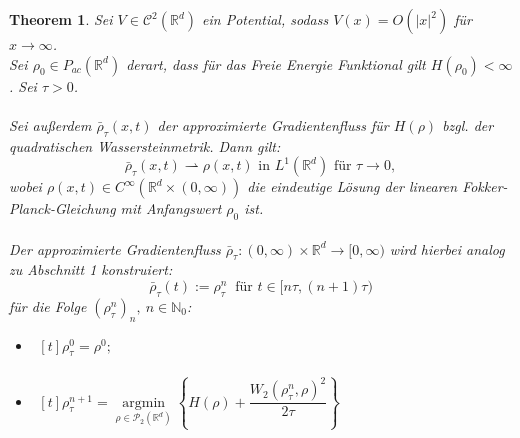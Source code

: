\documentclass[11pt,a4paper,notitlepage]{scrreprt}
\newcommand{\RR}{\mathbb{R}}
\newcommand{\NN}{\mathbb{N}}
\newtheorem{theorem}[defi]{Theorem}
\begin{document}
\begin{theorem}
Sei $V\in \mathcal{C}^2(\RR^d)$ ein Potential, sodass $V(x)=O(\vert x \vert^2)$ für $x\to\infty$. \\
Sei $\rho_0\in P_{ac}(\RR^d)$ derart, dass für das Freie Energie Funktional gilt $H(\rho_0)<\infty$. Sei $\tau>0$.\\\\
Sei außerdem $\bar{\rho}_\tau(x,t)$ der approximierte Gradientenfluss für $H(\rho)$ bzgl. der quadratischen Wassersteinmetrik. 
Dann gilt: \\
\begin{equation*}
\bar{\rho}_\tau(x,t)\rightharpoonup \rho(x,t) \text{ in } L^1(\RR^d) \text{ für } \tau\to 0,
\end{equation*}
wobei $\rho(x,t)\in C^\infty(\RR^d\times(0,\infty))$ die eindeutige Lösung der linearen Fokker-Planck-Gleichung mit Anfangswert $\rho_0$ ist. \\\\
Der approximierte Gradientenfluss $\bar{\rho}_\tau:(0,\infty)\times\RR^d\to[0,\infty)$ wird hierbei analog zu Abschnitt 1 konstruiert:
\begin{equation*}
\bar{\rho}_\tau(t):=\rho_\tau^n ~\text{ für }t\in[n\tau,(n+1)\tau)
\end{equation*}
für die Folge $(\rho_\tau^n)_n,~n\in\NN_0$:
\begin{itemize}
\item[i)]$\begin{aligned}[t]\rho_\tau^0=\rho^0; \end{aligned}$
\item[ii)]$\begin{aligned}[t]
\rho_\tau^{n+1}=\underset{\rho\in\mathcal{P}_{2}(\RR^d)}{\operatorname{argmin}}\left\{H(\rho)+\dfrac{W_2(\rho_\tau^n,\rho)^2}{2\tau}\right\}
\end{aligned}$\end{itemize}
\end{theorem}
\end{document}
